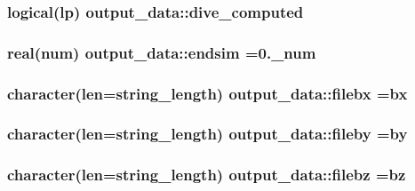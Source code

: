 \subsubsection[{\texorpdfstring{dive\+\_\+computed}{dive_computed}}]{\setlength{\rightskip}{0pt plus 5cm}logical(lp) output\+\_\+data\+::dive\+\_\+computed}\hypertarget{namespaceoutput__data_adcce4470ad25c02f78f99f1a71fc9371}{}\label{namespaceoutput__data_adcce4470ad25c02f78f99f1a71fc9371}
\subsubsection[{\texorpdfstring{endsim}{endsim}}]{\setlength{\rightskip}{0pt plus 5cm}real(num) output\+\_\+data\+::endsim =0.\+\_\+num}\hypertarget{namespaceoutput__data_a1ed464801538daa68f0f138d06be9c8a}{}\label{namespaceoutput__data_a1ed464801538daa68f0f138d06be9c8a}
\subsubsection[{\texorpdfstring{filebx}{filebx}}]{\setlength{\rightskip}{0pt plus 5cm}character(len=string\+\_\+length) output\+\_\+data\+::filebx =\textquotesingle{}bx\textquotesingle{}}\hypertarget{namespaceoutput__data_ac0a6ec606c33d1bc037b5ce85a9f4b3a}{}\label{namespaceoutput__data_ac0a6ec606c33d1bc037b5ce85a9f4b3a}
\subsubsection[{\texorpdfstring{fileby}{fileby}}]{\setlength{\rightskip}{0pt plus 5cm}character(len=string\+\_\+length) output\+\_\+data\+::fileby =\textquotesingle{}by\textquotesingle{}}\hypertarget{namespaceoutput__data_ac6e874f0a8121e42bed35e449a4a7c38}{}\label{namespaceoutput__data_ac6e874f0a8121e42bed35e449a4a7c38}
\subsubsection[{\texorpdfstring{filebz}{filebz}}]{\setlength{\rightskip}{0pt plus 5cm}character(len=string\+\_\+length) output\+\_\+data\+::filebz =\textquotesingle{}bz\textquotesingle{}}\hypertarget{namespaceoutput__data_a07a77b208c10f32c5723378f16ea4301}{}\label{namespaceoutput__data_a07a77b208c10f32c5723378f16ea4301}

